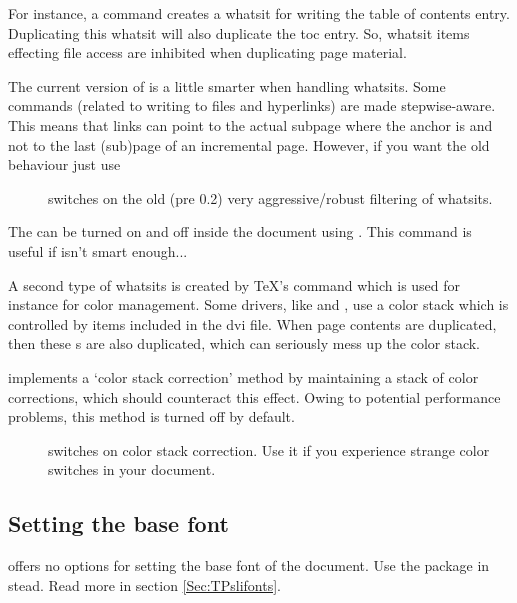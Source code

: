 \begin{slide}
For instance, a  command creates a whatsit for writing the table of contents entry. Duplicating this
whatsit will also duplicate the toc entry. So, whatsit items effecting file access are inhibited when duplicating page
material.

\newslide

The current version of  is a little smarter when handling whatsits. Some commands (related to writing to
files and hyperlinks) are made stepwise-aware. This means that links can point to the actual subpage where the
anchor is and not to the last (sub)page of an incremental page. However, if you want the old behaviour just use
\begin{description}
\item[] switches on the old
  (pre 0.2) very aggressive/robust filtering of whatsits.
\end{description}
The  can be turned on and off inside the document using . This command is
useful if  isn't smart enough...

\newslide

A second type of whatsits is created by \TeX's  command which is used for instance for color
management. Some drivers, like  and , use a color stack which is controlled by
 items included in the dvi file. When page contents are duplicated, then these s
are also duplicated, which can seriously mess up the color stack.

\newslide

 implements a `color stack correction' method by maintaining a stack of color corrections, which should
counteract this effect. Owing to potential performance problems, this method is turned off by default.
\begin{description}
\item[] switches on color stack correction. Use it if you experience strange color
  switches in your document.
\end{description}

\newslide

\subsection{Setting the base font}\label{Sec:BaseFont}
 offers no options for setting the base font of the document.
Use the  package in stead. Read more in section \ref{Sec:TPslifonts}.


\end{slide}

